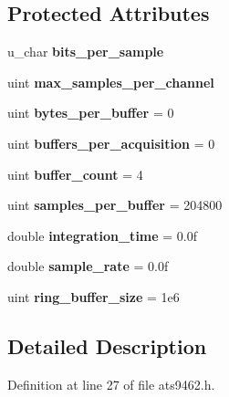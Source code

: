 \subsection*{Protected Attributes}
\begin{DoxyCompactItemize}
\item 
u\+\_\+char {\bfseries bits\+\_\+per\+\_\+sample}\hypertarget{classalazar_1_1_a_t_s9462_a3c06879f4a472cae8980dbca59de2ab8}{}\label{classalazar_1_1_a_t_s9462_a3c06879f4a472cae8980dbca59de2ab8}

\item 
uint {\bfseries max\+\_\+samples\+\_\+per\+\_\+channel}\hypertarget{classalazar_1_1_a_t_s9462_a35fb6e0f8229d283a7cf5a3caa019477}{}\label{classalazar_1_1_a_t_s9462_a35fb6e0f8229d283a7cf5a3caa019477}

\item 
uint {\bfseries bytes\+\_\+per\+\_\+buffer} = 0\hypertarget{classalazar_1_1_a_t_s9462_acf368609145cef04df523fd4e4dc3e3f}{}\label{classalazar_1_1_a_t_s9462_acf368609145cef04df523fd4e4dc3e3f}

\item 
uint {\bfseries buffers\+\_\+per\+\_\+acquisition} = 0\hypertarget{classalazar_1_1_a_t_s9462_a9edef52c0c4cd04f2d10e4c70abf5846}{}\label{classalazar_1_1_a_t_s9462_a9edef52c0c4cd04f2d10e4c70abf5846}

\item 
uint {\bfseries buffer\+\_\+count} = 4\hypertarget{classalazar_1_1_a_t_s9462_a564b69f9a510c11797498646cefd34a1}{}\label{classalazar_1_1_a_t_s9462_a564b69f9a510c11797498646cefd34a1}

\item 
uint {\bfseries samples\+\_\+per\+\_\+buffer} = 204800\hypertarget{classalazar_1_1_a_t_s9462_ac88e42e562a19d5a85854d2141652bad}{}\label{classalazar_1_1_a_t_s9462_ac88e42e562a19d5a85854d2141652bad}

\item 
double {\bfseries integration\+\_\+time} = 0.\+0f\hypertarget{classalazar_1_1_a_t_s9462_a089bac3e1e8014fbdf632839b7f31bd3}{}\label{classalazar_1_1_a_t_s9462_a089bac3e1e8014fbdf632839b7f31bd3}

\item 
double {\bfseries sample\+\_\+rate} = 0.\+0f\hypertarget{classalazar_1_1_a_t_s9462_a68dd5fc314dfc932a9f3dd50c7cdc117}{}\label{classalazar_1_1_a_t_s9462_a68dd5fc314dfc932a9f3dd50c7cdc117}

\item 
uint {\bfseries ring\+\_\+buffer\+\_\+size} = 1e6\hypertarget{classalazar_1_1_a_t_s9462_a6b25da2772535b5424e2131e01c95fd6}{}\label{classalazar_1_1_a_t_s9462_a6b25da2772535b5424e2131e01c95fd6}

\end{DoxyCompactItemize}


\subsection{Detailed Description}


Definition at line 27 of file ats9462.\+h.


